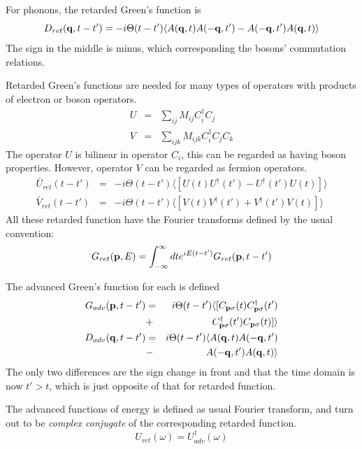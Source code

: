 For phonons, the retarded Green's function is
\begin{equation}
  D_{ret}(\mathbf{q},t-t') = -i\Theta(t-t')\langle A(\mathbf{q},t)A(-\mathbf{q},t') - A(-\mathbf{q},t')A(\mathbf{q},t)\rangle \label{3.85}
\end{equation}
The sign in the middle is minus, which corresponding the bosons' commutation relations.

Retarded Green's functions are needed for many types of operators with products of electron or boson operators.
\begin{eqnarray}
  U&=& \sum_{ij}M_{ij}C^\dagger_iC_j \label{3.86}\\
  V&=& \sum_{ijk}M_{ijk}C^\dagger_i C_j C_k \label{3.87}
\end{eqnarray}
The operator $U$ is bilinear in operator $C_i$, this can be regarded as having boson properties.
However, operator $V$ can be regarded as fermion operators.
\begin{eqnarray}
  \bar{U}_{ret}(t-t') &=& -i\Theta(t-t')\langle [U(t)U^\dagger(t') - U^\dagger(t')U(t)] \rangle \label{3.88} \\
  \bar{V}_{ret}(t-t') &=& -i\Theta(t-t')\langle [V(t)V^\dagger(t') + V^\dagger(t')V(t)] \rangle \label{3.89}
\end{eqnarray}
All these retarded function have the Fourier transforms defined by the usual convention:
\begin{equation}
  G_{ret}(\mathbf{p},E) = \int_{-\infty}^\infty dt e^{iE(t-t')} G_{ret}(\mathbf{p},t-t') \label{3.90}
\end{equation}

The advanced Green's function for each is defined
\begin{eqnarray}
  G_{adv}(\mathbf{p},t-t')&=&i\Theta(t-t')\langle [C_{\mathbf{p}\sigma}(t)C^\dagger_{\mathbf{p}\sigma}(t') \nonumber \\
  &+& C^\dagger_{\mathbf{p}\sigma}(t')C_{\mathbf{p}\sigma}(t)] \rangle \label{3.93} \\
  D_{adv}(\mathbf{q},t-t') &=& i\Theta(t-t')\langle A(\mathbf{q},t)A(-\mathbf{q},t') \nonumber \\
  &-& A(-\mathbf{q},t')A(\mathbf{q},t)\rangle \label{3.94}
\end{eqnarray}
The only two differences are the sign change in front and that the time domain is now $t'>t$, which is just opposite of that for retarded function.

The advanced functions of energy is defined as usual Fourier transform, and turn out to be \textit{complex conjugate} of the corresponding retarded function.
\begin{equation}
  U_{ret}(\omega) = U_{adv}^\dagger(\omega) \label{3.98}
\end{equation}

